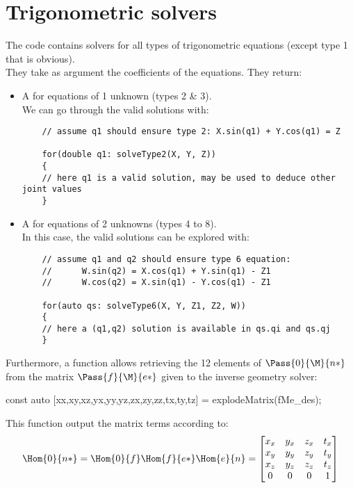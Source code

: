 \documentclass{ecnreport}
\begin{document}
  \newpage
  \section{Trigonometric solvers}\label{trigsolve}

  The code contains solvers for all types of trigonometric equations (except type 1 that is obvious).\\
  They take as argument the coefficients of the equations. They return:
  \begin{itemize}
    \item A  for equations of 1 unknown (types 2 \& 3).\\We can go through the valid solutions with:
    \cppstyle
    \begin{lstlisting}
    // assume q1 should ensure type 2: X.sin(q1) + Y.cos(q1) = Z

    for(double q1: solveType2(X, Y, Z))
    {
    // here q1 is a valid solution, may be used to deduce other joint values
    }
    \end{lstlisting}
    \item A  for equations of 2 unknowns (types 4 to 8).\\In this case, the valid solutions can be explored with:
    \cppstyle
    \begin{lstlisting}
    // assume q1 and q2 should ensure type 6 equation:
    //		W.sin(q2) = X.cos(q1) + Y.sin(q1) - Z1
    //		W.cos(q2) = X.sin(q1) - Y.cos(q1) - Z1

    for(auto qs: solveType6(X, Y, Z1, Z2, W))
    {
    // here a (q1,q2) solution is available in qs.qi and qs.qj
    }
    \end{lstlisting}
  \end{itemize}

  Furthermore, a function allows retrieving the 12 elements of $\Pass{0}{\M}{n*}$ from the matrix $\Pass{f}{\M}{e*}$ given to the inverse geometry solver:
  \begin{cppcode}
    const auto [xx,xy,xz,yx,yy,yz,zx,zy,zz,tx,ty,tz] = explodeMatrix(fMe_des);
\end{cppcode}
This function output the matrix terms according to:
\begin{equation*}
\Hom{0}{n*} = \Hom{0}{f}\Hom{f}{e*}\Hom{e}{n} = \left[\begin{matrix}x_x & y_x & z_x & t_x\\x_y & y_y & z_y & t_y\\x_z & y_z & z_z & t_z\\0 & 0 & 0 & 1\end{matrix}\right]
\end{equation*}
\end{document}
